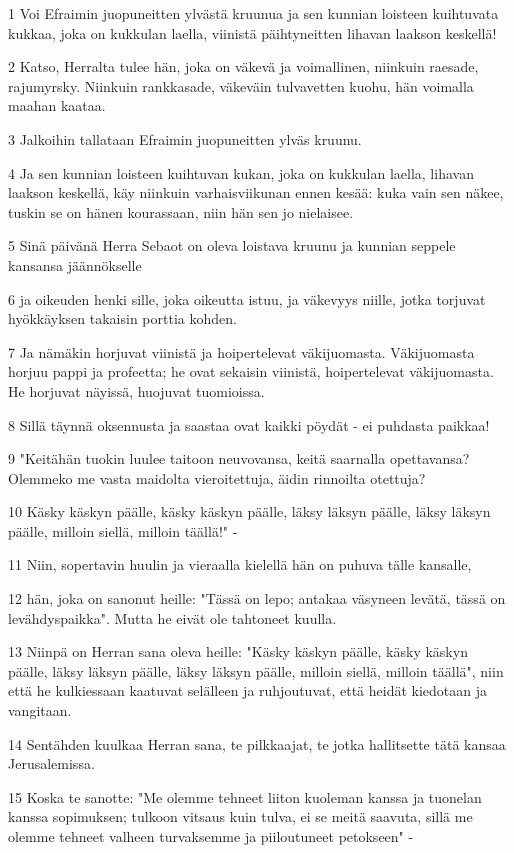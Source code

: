 \par 1 Voi Efraimin juopuneitten ylvästä kruunua ja sen kunnian loisteen kuihtuvata kukkaa, joka on kukkulan laella, viinistä päihtyneitten lihavan laakson keskellä!
\par 2 Katso, Herralta tulee hän, joka on väkevä ja voimallinen, niinkuin raesade, rajumyrsky. Niinkuin rankkasade, väkeväin tulvavetten kuohu, hän voimalla maahan kaataa.
\par 3 Jalkoihin tallataan Efraimin juopuneitten ylväs kruunu.
\par 4 Ja sen kunnian loisteen kuihtuvan kukan, joka on kukkulan laella, lihavan laakson keskellä, käy niinkuin varhaisviikunan ennen kesää: kuka vain sen näkee, tuskin se on hänen kourassaan, niin hän sen jo nielaisee.
\par 5 Sinä päivänä Herra Sebaot on oleva loistava kruunu ja kunnian seppele kansansa jäännökselle
\par 6 ja oikeuden henki sille, joka oikeutta istuu, ja väkevyys niille, jotka torjuvat hyökkäyksen takaisin porttia kohden.
\par 7 Ja nämäkin horjuvat viinistä ja hoipertelevat väkijuomasta. Väkijuomasta horjuu pappi ja profeetta; he ovat sekaisin viinistä, hoipertelevat väkijuomasta. He horjuvat näyissä, huojuvat tuomioissa.
\par 8 Sillä täynnä oksennusta ja saastaa ovat kaikki pöydät - ei puhdasta paikkaa!
\par 9 "Keitähän tuokin luulee taitoon neuvovansa, keitä saarnalla opettavansa? Olemmeko me vasta maidolta vieroitettuja, äidin rinnoilta otettuja?
\par 10 Käsky käskyn päälle, käsky käskyn päälle, läksy läksyn päälle, läksy läksyn päälle, milloin siellä, milloin täällä!" -
\par 11 Niin, sopertavin huulin ja vieraalla kielellä hän on puhuva tälle kansalle,
\par 12 hän, joka on sanonut heille: "Tässä on lepo; antakaa väsyneen levätä, tässä on levähdyspaikka". Mutta he eivät ole tahtoneet kuulla.
\par 13 Niinpä on Herran sana oleva heille: "Käsky käskyn päälle, käsky käskyn päälle, läksy läksyn päälle, läksy läksyn päälle, milloin siellä, milloin täällä", niin että he kulkiessaan kaatuvat selälleen ja ruhjoutuvat, että heidät kiedotaan ja vangitaan.
\par 14 Sentähden kuulkaa Herran sana, te pilkkaajat, te jotka hallitsette tätä kansaa Jerusalemissa.
\par 15 Koska te sanotte: "Me olemme tehneet liiton kuoleman kanssa ja tuonelan kanssa sopimuksen; tulkoon vitsaus kuin tulva, ei se meitä saavuta, sillä me olemme tehneet valheen turvaksemme ja piiloutuneet petokseen" -
